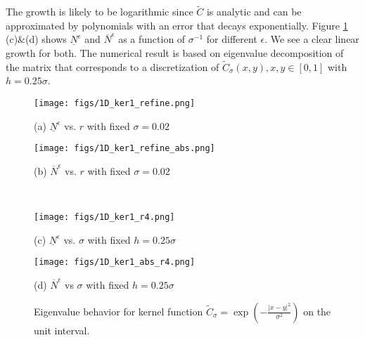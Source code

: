 \documentclass[11pt]{amsart}
\begin{document}
The growth is likely to be logarithmic since $\tilde{C}$ is analytic and can be approximated by polynomials with an error that decays exponentially. 
Figure \ref{fig:1D-ker1} (c)\&(d) shows $\underline{N}^{\epsilon}$ and $\overline{N}^{\epsilon}$ as a function of $\sigma^{-1}$ for different $\epsilon$. We see a clear linear growth for both. The numerical result is based on eigenvalue decomposition of the matrix that corresponds to a discretization of  $\tilde{C}_{\sigma}(x,y), x, y \in [0,1]$ with $h=0.25\sigma$. 

\begin{figure}[!htb]
	\begin{center}
		\hspace{-0.6cm}
		\begin{minipage}{0.46\textwidth}
			\texttt{[image: figs/1D\_ker1\_refine.png]}
			\caption*{(a) $\underline{N}^{\epsilon}$ vs. $r$ with fixed $\sigma = 0.02$}
		\end{minipage}
 \hfil
		\begin{minipage}{0.46\textwidth}
		\texttt{[image: figs/1D\_ker1\_refine\_abs.png]}
		\caption*{(b) $\overline{N}^{\epsilon}$ vs. $r$ with fixed $\sigma = 0.02$}
		\end{minipage}
		\\
		\vspace{0.3cm}
		\hspace{-0.6cm}
		\begin{minipage}{0.46\textwidth}
		\texttt{[image: figs/1D\_ker1\_r4.png]}
		\caption*{(c) $\underline{N}^{\epsilon}$ vs. $\sigma$ with fixed $h=0.25\sigma$}
		\end{minipage}
		\hfil
		\begin{minipage}{0.46\textwidth}
		\texttt{[image: figs/1D\_ker1\_abs\_r4.png]}
		\caption*{(d) $\overline{N}^{\epsilon}$ vs $\sigma$ with fixed $h=0.25\sigma$}
		\end{minipage}
		\caption{Eigenvalue behavior for kernel function $\tilde{C}_{\sigma}=\exp(-\frac{|x-y|^2}{\sigma^2})$ on the unit interval.}
		\label{fig:1D-ker1}
	\end{center}
\end{figure}
\end{document}

